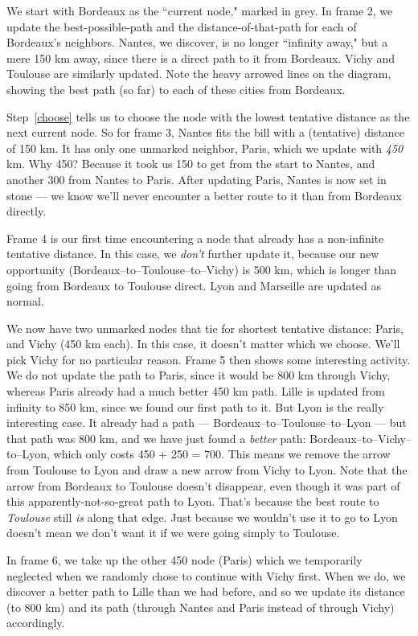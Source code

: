 We start with Bordeaux as the ``current node," marked in grey. In frame 2,
we update the best-possible-path and the distance-of-that-path for each of
Bordeaux's neighbors. Nantes, we discover, is no longer ``infinity away,"
but a mere 150 km away, since there is a direct path to it from Bordeaux.
Vichy and Toulouse are similarly updated. Note the heavy arrowed lines on
the diagram, showing the best path (so far) to each of these cities from
Bordeaux. 

Step~\ref{choose} tells us to choose the node with the lowest tentative
distance as the next current node. So for frame 3, Nantes fits the bill
with a (tentative) distance of 150 km. It has only one unmarked neighbor,
Paris, which we update with \textit{450} km. Why 450? Because it took us
150 to get from the start to Nantes, and another 300 from Nantes to Paris.
After updating Paris, Nantes is now set in stone --- we know we'll never
encounter a better route to it than from Bordeaux directly.

Frame 4 is our first time encountering a node that already has a
non-infinite tentative distance. In this case, we \textit{don't} further
update it, because our new opportunity (Bordeaux--to--Toulouse--to--Vichy)
is 500 km, which is longer than going from Bordeaux to Toulouse direct.
Lyon and Marseille are updated as normal.

We now have two unmarked nodes that tie for shortest tentative distance:
Paris, and Vichy (450 km each). In this case, it doesn't matter which we
choose. We'll pick Vichy for no particular reason. Frame 5 then shows some
interesting activity. We do not update the path to Paris, since it would be
800 km through Vichy, whereas Paris already had a much better 450 km path.
Lille is updated from infinity to 850 km, since we found our first path to
it. But Lyon is the really interesting case. It already had a path ---
Bordeaux--to--Toulouse--to--Lyon --- but that path was 800 km, and we have
just found a \textit{better} path: Bordeaux--to--Vichy--to--Lyon, which
only costs 450 + 250 = 700. This means we remove the arrow from Toulouse to
Lyon and draw a new arrow from Vichy to Lyon. Note that the arrow from
Bordeaux to Toulouse doesn't disappear, even though it was part of this
apparently-not-so-great path to Lyon. That's because the best route to
\textit{Toulouse} still \textit{is} along that edge. Just because we
wouldn't use it to go to Lyon doesn't mean we don't want it if we were
going simply to Toulouse.

In frame 6, we take up the other 450 node (Paris) which we temporarily
neglected when we randomly chose to continue with Vichy first. When we do,
we discover a better path to Lille than we had before, and so we update its
distance (to 800 km) and its path (through Nantes and Paris instead of
through Vichy) accordingly.

